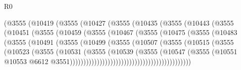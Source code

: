 \begin{lexlean}{R0}
\begin{coremodule}
                      (@3555
                        (@10419
                          (@3555
                            (@10427
                              (@3555
                                (@10435
                                  (@3555
                                    (@10443
                                      (@3555
                                        (@10451
                                          (@3555
                                            (@10459
                                              (@3555
                                                (@10467
                                                  (@3555
                                                    (@10475
                                                      (@3555
                                                        (@10483
                                                          (@3555
                                                            (@10491
                                                              (@3555
                                                                (@10499
                                                                  (@3555
                                                                    (@10507
                                                                      (@3555
                                                                        (@10515
                                                                          (@3555
                                                                            (@10523
                                                                              (@3555
                                                                                (@10531
                                                                                  (@3555
                                                                                    (@10539
                                                                                      (@3555
                                                                                        (@10547
                                                                                          (@3555
                                                                                            (@10551
                                                                                              @10553
                                                                                              @6612
                                                                                              @3551)))))))))))))))))))))))))))))))))))))))))))))

\end{coremodule}
\end{lexlean}
